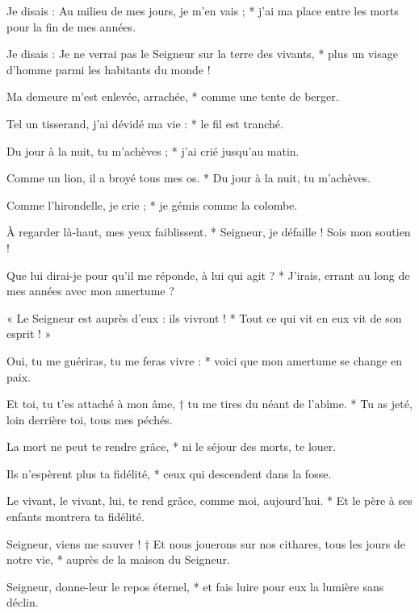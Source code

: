 \item Je disais : Au milieu de mes jours, je m’en vais ; * j’ai ma place entre les morts pour la fin de mes années.

\item Je disais : Je ne verrai pas le Seigneur sur la terre des vivants, * plus un visage d’homme parmi les habitants du monde !

\item Ma demeure m’est enlevée, arrachée, * comme une tente de berger.

\item Tel un tisserand, j’ai dévidé ma vie : * le fil est tranché.

\item Du jour à la nuit, tu m’achèves ; * j’ai crié jusqu’au matin.

\item Comme un lion, il a broyé tous mes os. * Du jour à la nuit, tu m’achèves. 

\item Comme l’hirondelle, je crie ; * je gémis comme la colombe.

\item À regarder là-haut, mes yeux faiblissent. * Seigneur, je défaille ! Sois mon soutien !

\item Que lui dirai-je pour qu’il me réponde, à lui qui agit ? * J’irais, errant au long de mes années avec mon amertume ?

\item « Le Seigneur est auprès d’eux : ils vivront ! * Tout ce qui vit en eux vit de son esprit ! »

\item Oui, tu me guériras, tu me feras vivre : * voici que mon amertume se change en paix.

\item Et toi, tu t’es attaché à mon âme, † tu me tires du néant de l’abîme. * Tu as jeté, loin derrière toi, tous mes péchés.

\item La mort ne peut te rendre grâce, * ni le séjour des morts, te louer.

\item Ils n’espèrent plus ta fidélité, * ceux qui descendent dans la fosse.

\item Le vivant, le vivant, lui, te rend grâce, comme moi, aujourd’hui. * Et le père à ses enfants montrera ta fidélité.

\item Seigneur, viens me sauver ! † Et nous jouerons sur nos cithares, tous les jours de notre vie, * auprès de la maison du Seigneur.

\item Seigneur, donne-leur le repos éternel, * et fais luire pour eux la lumière sans déclin.